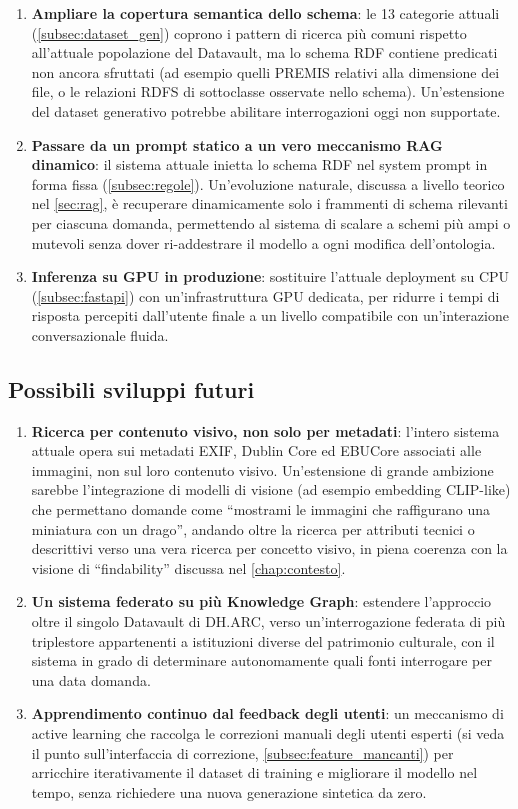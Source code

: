 \begin{enumerate}
    \item \textbf{Ampliare la copertura semantica dello schema}: le 13 categorie attuali (\cref{subsec:dataset_gen}) coprono i pattern di ricerca più comuni rispetto all'attuale popolazione del Datavault, ma lo schema RDF contiene predicati non ancora sfruttati (ad esempio quelli PREMIS relativi alla dimensione dei file, o le relazioni RDFS di sottoclasse osservate nello schema). Un'estensione del dataset generativo potrebbe abilitare interrogazioni oggi non supportate.
    \item \textbf{Passare da un prompt statico a un vero meccanismo RAG dinamico}: il sistema attuale inietta lo schema RDF nel system prompt in forma fissa (\cref{subsec:regole}). Un'evoluzione naturale, discussa a livello teorico nel \cref{sec:rag}, è recuperare dinamicamente solo i frammenti di schema rilevanti per ciascuna domanda, permettendo al sistema di scalare a schemi più ampi o mutevoli senza dover ri-addestrare il modello a ogni modifica dell'ontologia.
    \item \textbf{Inferenza su GPU in produzione}: sostituire l'attuale deployment su CPU (\cref{subsec:fastapi}) con un'infrastruttura GPU dedicata, per ridurre i tempi di risposta percepiti dall'utente finale a un livello compatibile con un'interazione conversazionale fluida.
\end{enumerate}

\subsection{Possibili sviluppi futuri}\label{subsec:sviluppi_futuri}

\begin{enumerate}
    \item \textbf{Ricerca per contenuto visivo, non solo per metadati}: l'intero sistema attuale opera sui metadati EXIF, Dublin Core ed EBUCore associati alle immagini, non sul loro contenuto visivo. Un'estensione di grande ambizione sarebbe l'integrazione di modelli di visione (ad esempio embedding CLIP-like) che permettano domande come ``mostrami le immagini che raffigurano una miniatura con un drago'', andando oltre la ricerca per attributi tecnici o descrittivi verso una vera ricerca per concetto visivo, in piena coerenza con la visione di ``findability'' discussa nel \cref{chap:contesto}.
    \item \textbf{Un sistema federato su più Knowledge Graph}: estendere l'approccio oltre il singolo Datavault di DH.ARC, verso un'interrogazione federata di più triplestore appartenenti a istituzioni diverse del patrimonio culturale, con il sistema in grado di determinare autonomamente quali fonti interrogare per una data domanda.
    \item \textbf{Apprendimento continuo dal feedback degli utenti}: un meccanismo di active learning che raccolga le correzioni manuali degli utenti esperti (si veda il punto sull'interfaccia di correzione, \cref{subsec:feature_mancanti}) per arricchire iterativamente il dataset di training e migliorare il modello nel tempo, senza richiedere una nuova generazione sintetica da zero.
\end{enumerate}

